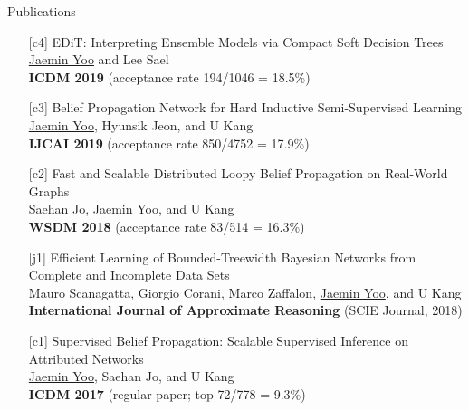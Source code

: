 \documentclass{resume} %
\begin{document}
\begin{rSection}{Publications}
\begin{enumerate}
	\item[{[c4]}]
		EDiT: Interpreting Ensemble Models via Compact Soft Decision Trees \\
		\underline{Jaemin Yoo} and Lee Sael \\
		\textbf{ICDM 2019} (acceptance rate 194/1046 = 18.5\%)

	\item[{[c3]}]
		Belief Propagation Network for Hard Inductive Semi-Supervised Learning \\
		\underline{Jaemin Yoo}, Hyunsik Jeon, and U Kang \\
		\textbf{IJCAI 2019} (acceptance rate 850/4752 = 17.9\%)

	\item[{[c2]}]
		Fast and Scalable Distributed Loopy Belief Propagation on Real-World Graphs \\
		Saehan Jo, \underline{Jaemin Yoo}, and U Kang \\
		\textbf{WSDM 2018} (acceptance rate 83/514 = 16.3\%)

	\item[{[j1]}]
		Efficient Learning of Bounded-Treewidth Bayesian Networks from Complete and Incomplete Data Sets \\
		Mauro Scanagatta, Giorgio Corani, Marco Zaffalon, \underline{Jaemin Yoo}, and U Kang \\
		\textbf{International Journal of Approximate Reasoning} (SCIE Journal, 2018)

	\item[{[c1]}]
		Supervised Belief Propagation: Scalable Supervised Inference on Attributed Networks \\
		\underline{Jaemin Yoo}, Saehan Jo, and U Kang \\
		\textbf{ICDM 2017} (regular paper; top 72/778 = 9.3\%)

\end{enumerate}
\end{rSection}

\end{document}
